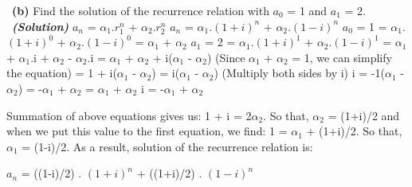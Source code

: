\documentclass[a4 paper]{article}
\numberwithin{equation}{section}
\newcommand{\subproblem}[1]{~\newline\textbf{(#1)}}
\newcommand{\solution}{~\newline\textbf{\textit{(Solution)}} }
\newcommand{\0}{\mathbf{0}}
\begin{document}
\subproblem{b} Find the solution of the recurrence relation with $a_0$ = 1 and $a_1$ = 2.
\solution
\newline
\newline
$a_n$ = $\alpha_1$.$r_1^n$ + $\alpha_2$.$r_2^n$\newline
$a_n$ = $\alpha_1$.$(1+i)^n$ + $\alpha_2$.$(1-i)^n$\newline\newline
$a_0$ = 1 = $\alpha_1$.$(1+i)^0$ + $\alpha_2$.$(1-i)^0$ = $\alpha_1$ + $\alpha_2$\newline\newline
$a_1$ = 2 = $\alpha_1$.$(1+i)^1$ + $\alpha_2$.$(1-i)^1$ = $\alpha_1$ + $\alpha_1$.i + $\alpha_2$ - $\alpha_2$.i = $\alpha_1$ + $\alpha_2$ + i($\alpha_1$ - $\alpha_2$) (Since $\alpha_1$ + $\alpha_2$ = 1, we can simplify the equation) = 1 + i($\alpha_1$ - $\alpha_2$) = i($\alpha_1$ - $\alpha_2$) (Multiply both sides by i)\newline
i = -1($\alpha_1$ - $\alpha_2$) = -$\alpha_1$ + $\alpha_2$\newline{} = $\alpha_1$ + $\alpha_2$\newline
i = -$\alpha_1$ + $\alpha_2$\newline

Summation of above equations gives us: 1 + i = 2$\alpha_2$. So that, $\alpha_2$ = (1+i)/2 and when we put this value to the first equation, we find: 1 = $\alpha_1$ + (1+i)/2. So that, $\alpha_1$ = (1-i)/2. \newline \newline
As a result, solution of the recurrence relation is: \newline

$a_n$ = ((1-i)/2) . $(1+i)^n$ + ((1+i)/2) . $(1-i)^n$\newline\newline
\end{document}
